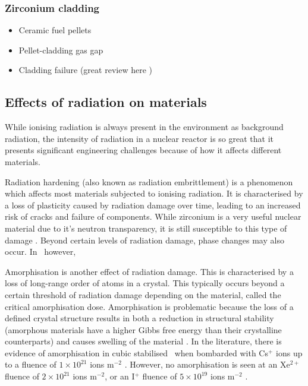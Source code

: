 \subsubsection{Zirconium cladding}



\begin{itemize}
\item Ceramic fuel pellets
\item Pellet-cladding gas gap
\item Cladding failure (great review here \cite{alam2011review})
\end{itemize}

\subsection{Effects of radiation on materials}

While ionising radiation is always present in the environment as background radiation, the intensity of radiation in a nuclear reactor is so great that it presents significant engineering challenges because of how it affects different materials.

Radiation hardening (also known as radiation embrittlement) is a phenomenon which affects most materials subjected to ionising radiation. It is characterised by a loss of plasticity caused by radiation damage over time, leading to an increased risk of cracks and failure of components. While zirconium is a very useful nuclear material due to it's neutron transparency, it is still susceptible to this type of damage \cite{Wisner1998}. Beyond certain levels of radiation damage, phase changes may also occur. In \zirconia\ however,  

Amorphisation is another effect of radiation damage. This is characterised by a loss of long-range order of atoms in a crystal. This typically occurs beyond a certain threshold of radiation damage depending on the material, called the critical amorphisation dose. Amorphisation is problematic because the loss of a defined crystal structure results in both a reduction in structural stability (amorphous materials have a higher Gibbs free energy than their crystalline counterparts) and causes swelling of the material \cite{Einfal2013}. In the literature, there is evidence of amorphisation in cubic stabilised \zirconia\ when bombarded with Cs$^{+}$ ions up to a fluence of $1 \times 10^{21}$ ions m$^{-2}$ \cite{amorphization2000wang}. However, no amorphisation is seen at an Xe$^{2+}$ fluence of $2 \times 10^{21}$ ions m$^{-2}$, or an I$^{+}$ fluence of $5 \times 10^{19}$ ions m$^{-2}$ \cite{sickafus1999radiation}.

